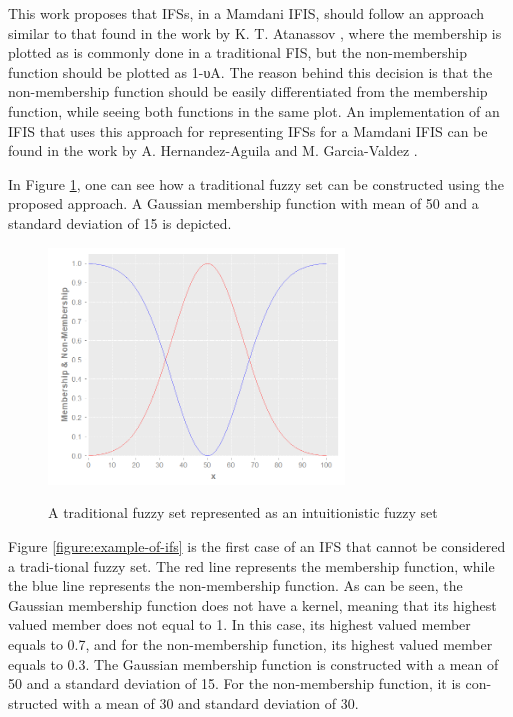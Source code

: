 This work proposes that IFSs, in a Mamdani IFIS, should follow an approach
similar to that found in the work by K. T. Atanassov \cite{Atanassov2003}, where
the membership is plotted as is commonly done in a traditional FIS, but the
non-membership function should be plotted as 1-υA. The reason behind this
decision is that the non-membership function should be easily differentiated
from the membership function, while seeing both functions in the same plot. An
implementation of an IFIS that uses this approach for representing IFSs for a
Mamdani IFIS can be found in the work by A. Hernandez-Aguila and
M. Garcia-Valdez \cite{Hernandez-aguila}.

In Figure \ref{figure:traditional-set-as-ifs}, one can see how a traditional
fuzzy set can be constructed using the proposed approach. A Gaussian membership
function with mean of 50 and a standard deviation of 15 is depicted.

\begin{figure}
\caption{A traditional fuzzy set represented as an intuitionistic fuzzy set}
\centering \includegraphics[width=0.7\textwidth]{img/traditional-set-as-ifs.png}
\label{figure:traditional-set-as-ifs}
\end{figure}

Figure \ref{figure:example-of-ifs} is the first case of an IFS that cannot be
considered a tradi-tional fuzzy set. The red line represents the membership
function, while the blue line represents the non-membership function. As can be
seen, the Gaussian membership function does not have a kernel, meaning that its
highest valued member does not equal to 1. In this case, its highest valued
member equals to 0.7, and for the non-membership function, its highest valued
member equals to 0.3. The Gaussian membership function is constructed with a
mean of 50 and a standard deviation of 15. For the non-membership function, it
is con-structed with a mean of 30 and standard deviation of 30.

